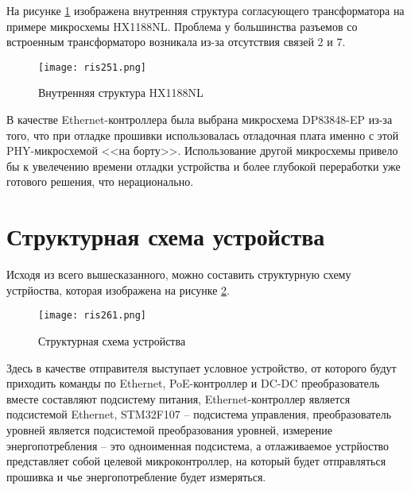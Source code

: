 На рисунке \ref{ris:251} изображена внутренняя структура согласующего трансформатора на примере микросхемы
HX1188NL. Проблема у большинства разъемов со встроенным трансформаторо возникала из-за
отсутствия связей 2 и 7. 

\begin{figure}[H]
  \centering
  \texttt{[image: ris251.png]}
  \caption{Внутренняя структура HX1188NL}
  \label{ris:251}
\end{figure}

В качестве Ethernet-контроллера была выбрана микросхема DP83848-EP из-за того, что при отладке
прошивки использовалась отладочная плата именно с этой PHY-микросхемой <<на борту>>. Использование
другой микросхемы привело бы к увелечению времени отладки устройства и более глубокой переработки
уже готового решения, что нерационально.

\section{Структурная схема устройства}
\hspace{1cm}

Исходя из всего вышесказанного, можно составить структурную схему устрйоства, которая изображена
на рисунке \ref{ris:261}.

\begin{figure}[H]
  \centering
  \texttt{[image: ris261.png]}
  \caption{Структурная схема устройства}
  \label{ris:261}
\end{figure}

Здесь в качестве отправителя выступает условное устройство, от которого будут приходить
команды по Ethernet, PoE-контроллер и DC-DC преобразователь вместе составляют подсистему питания,
Ethernet-контроллер является подсистемой Ethernet, STM32F107 -- подсистема управления, 
преобразователь уровней является подсистемой преобразования уровней, измерение энергопотребления --
это одноименная подсистема, а отлаживаемое устрйоство представляет собой целевой микроконтроллер,
на который будет отправляться прошивка и чье энергопотребление будет измеряться.


